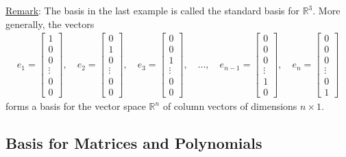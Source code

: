 \documentclass[12pt,a4paper]{article}
\newcounter{example}[section]
\begin{document}
	\noindent\underline{Remark}: The basis in the last example is called the standard basis for $\mathbb{R}^3$. More generally, the vectors
		\begin{align*}
		e_1 = \begin{bmatrix}
		1 \\ 0 \\ 0 \\ \vdots \\ 0 \\ 0
		\end{bmatrix} , \quad
		e_2 = \begin{bmatrix}
		0 \\ 1 \\ 0 \\ \vdots \\ 0 \\ 0
		\end{bmatrix} , \quad
		e_3 = \begin{bmatrix}
		0 \\ 0 \\ 1 \\ \vdots \\ 0 \\ 0
		\end{bmatrix} , \quad 
		\ldots , \quad
		e_{n-1} = \begin{bmatrix}
		0 \\ 0 \\ 0 \\ \vdots \\ 1 \\ 0
		\end{bmatrix} , \quad
		e_{n} = \begin{bmatrix}
		0 \\ 0 \\ 0 \\ \vdots \\ 0 \\ 1
		\end{bmatrix}
		\end{align*}
	forms a basis for the vector space $\mathbb{R}^n$ of column vectors of dimensions $n \times 1$.
	
	\newpage
	
	\subsection{Basis for Matrices and Polynomials}
	
\end{document}
